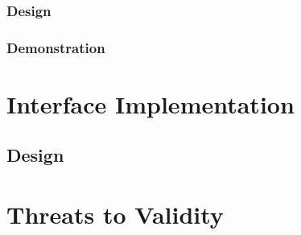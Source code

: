 \subsubsection{Design}

\subsubsection{Demonstration}

\section{Interface Implementation}

\subsection{Design}

\section{Threats to Validity}



